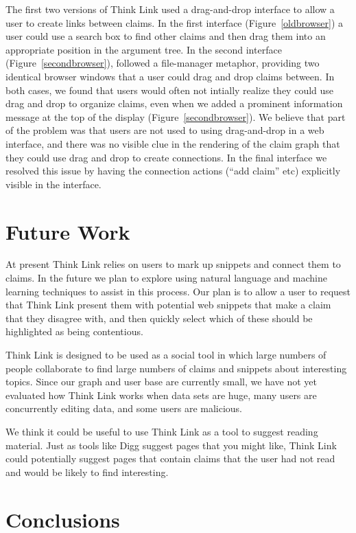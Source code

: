 \documentclass{chi2009}
\begin{document}
The first two versions of Think Link used a drag-and-drop interface to allow a user to create links between claims. In the first interface (Figure~\ref{oldbrowser}) a user could use a search box to find other claims and then drag them into an appropriate position in the argument tree. In the second interface (Figure~\ref{secondbrowser}), followed a file-manager metaphor, providing two identical browser windows that a user could drag and drop claims between. In both cases, we found that users would often not intially realize they could use drag and drop to organize claims, even when we added a prominent information message at the top of the display (Figure~\ref{secondbrowser}). We believe that part of the problem was that users are not used to using drag-and-drop in a web interface, and there was no visible clue in the rendering of the claim graph that they could use drag and drop to create connections. In the final interface we resolved this issue by having the connection actions (``add claim'' etc) explicitly visible in the interface.

\section{Future Work}

At present Think Link relies on users to mark up snippets and connect them to claims. In the future we plan to explore using natural language and machine learning techniques to assist in this process. Our plan is to allow a user to request that Think Link present them with potential web snippets that make a claim that they disagree with, and then quickly select which of these should be highlighted as being contentious.

Think Link is designed to be used as a social tool in which large numbers of people collaborate to find large numbers of claims and snippets about interesting topics. Since our graph and user base are currently small, we have not yet evaluated how Think Link works when data sets are huge, many users are concurrently editing data, and some users are malicious.

We think it could be useful to use Think Link as a tool to suggest reading material. Just as tools like Digg suggest pages that you might like, Think Link could potentially suggest pages that contain claims that the user had not read and would be likely to find interesting.

\section{Conclusions}
\end{document}
